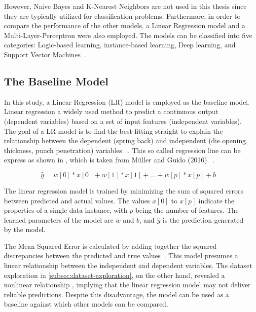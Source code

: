 {However, Naive Bayes and K-Nearest Neighbors are not used in this thesis since they are typically
utilized for classification problems.
Furthermore, in order to compare the performance of the other models, a Linear Regression model
and a Multi-Layer-Perceptron were also employed.
The models can be classified into five categories: Logic-based learning, instance-based learning, Deep learning, and
Support Vector Machines~\cite[p. 8]{dridi2021supervised}.

\subsection{The Baseline Model}\label{subsec:regression-models}
In this study, a Linear Regression (LR) model is employed as the baseline model.
Linear regression a widely used method to predict a continuous output (dependent variables) based on a set
of input features (independent variables).
The goal of a \ac{LR} model is to find the best-fitting straight to explain the relationship between the dependent
(spring back) and independent (die opening, thickness, punch penetration)
variables
~\cite[pp. 45--46]{muller_introductionmachinelearning_2016}.
This so called regression line can be express as shown in , which is taken from
Müller and Guido (2016)
~\cite[p. 45]{muller_introductionmachinelearning_2016}.

\begin{tcolorbox}[arc=0pt,boxrule=0.5pt]
    \begin{equation}
        \hat{y} = w[0] * x[0] + w[1] * x[1] + ... + w[p] * x[p] + b
        \label{eq:linear-regression}
    \end{equation}
\end{tcolorbox}

The linear regression model is trained by minimizing the sum of squared errors between predicted and actual values.
The values $x[0]$ to $x[p]$ indicate the properties of a single data instance, with $p$ being the number of
features.
The learned parameters of the model are $w$ and $b$, and $\hat{y}$  is the prediction generated by the model.

The Mean Squared Error is calculated by adding together the squared discrepancies between the predicted and true
values~\cite[p. 47--68]{muller_introductionmachinelearning_2016}.
This model presumes a linear relationship between the independent and dependent variables.
The dataset exploration in \cref{subsec:dataset-exploration}, on the other hand, revealed a nonlinear relationship
, implying that the linear regression model may not deliver reliable predictions.
Despite this disadvantage, the model can be used as a baseline against which other models can be compared.

}
